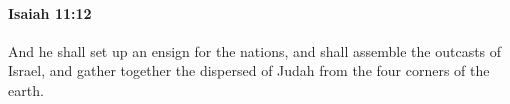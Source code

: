
		\paragraph{Isaiah 11:12} %
			\label{ISAIAH-11-12}

			And he shall set up an ensign for the nations, and shall assemble the outcasts of Israel, and gather together the dispersed of Judah from the four corners of the earth.


